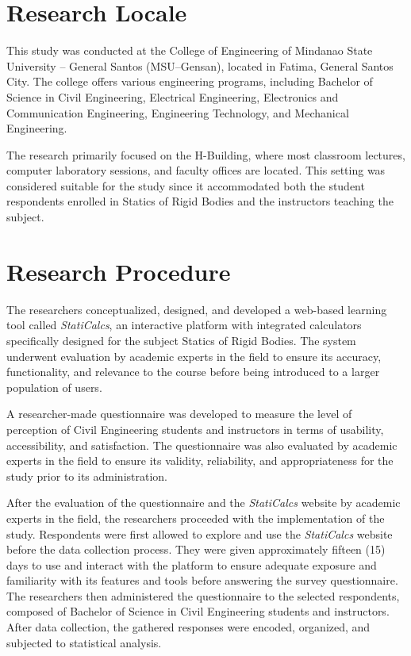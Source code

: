 \section{Research Locale}\label{sec:3-locale}

This study was conducted at the College of Engineering of Mindanao State University -- General Santos (MSU--Gensan), located in Fatima, General Santos City. The college offers various engineering programs, including Bachelor of Science in Civil Engineering, Electrical Engineering, Electronics and Communication Engineering, Engineering Technology, and Mechanical Engineering.  

The research primarily focused on the H-Building, where most classroom lectures, computer laboratory sessions, and faculty offices are located. This setting was considered suitable for the study since it accommodated both the student respondents enrolled in Statics of Rigid Bodies and the instructors teaching the subject.

\section{Research Procedure}\label{sec:3-proc}


The researchers conceptualized, designed, and developed a web-based learning tool called \textit{StatiCalcs}, an interactive platform with integrated calculators specifically designed for the subject Statics of Rigid Bodies. The system underwent evaluation by academic experts in the field to ensure its accuracy, functionality, and relevance to the course before being introduced to a larger population of users.  

A researcher-made questionnaire was developed to measure the level of perception of Civil Engineering students and instructors in terms of usability, accessibility, and satisfaction. The questionnaire was also evaluated by academic experts in the field to ensure its validity, reliability, and appropriateness for the study prior to its administration.  

After the evaluation of the questionnaire and the \textit{StatiCalcs} website by academic experts in the field, the researchers proceeded with the implementation of the study. Respondents were first allowed to explore and use the \textit{StatiCalcs} website before the data collection process. They were given approximately fifteen (15) days to use and interact with the platform to ensure adequate exposure and familiarity with its features and tools before answering the survey questionnaire. The researchers then administered the questionnaire to the selected respondents, composed of Bachelor of Science in Civil Engineering students and instructors. After data collection, the gathered responses were encoded, organized, and subjected to statistical analysis.  

